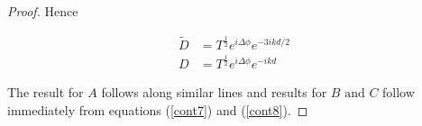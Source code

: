 \documentclass{article}
\begin{document}
\begin{proof}
\noindent Hence

\begin{subequations}
\begin{align}
\tilde{D} &= T^{\frac{1}{2}}e^{i\Delta\phi}e^{-3ikd/2}\\
	D&=T^{\frac{1}{2}}e^{i\Delta\phi}e^{-ikd}
\end{align}
\end{subequations}

\noindent The result for $A$ follows along similar lines and results for $B \text{ and } C$ follow immediately from equations (\ref{cont7}) and (\ref{cont8}).
\end{proof}

\end{document}
